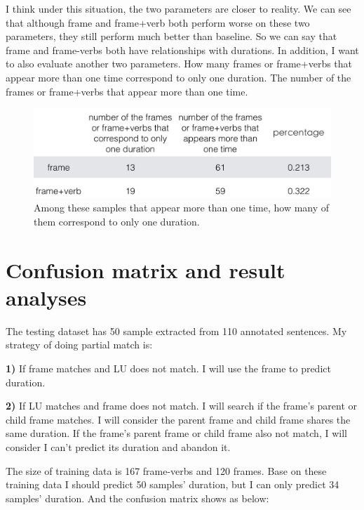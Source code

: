 \documentclass[11pt,a4paper]{article}
\begin{document}
I think under this situation, the two parameters are closer to reality. We can see that although frame and frame+verb both perform worse on these two parameters, they still perform much better than baseline. So we can say that frame and frame-verbs both have relationships with durations.
In addition, I want to also evaluate another two parameters.
How many frames or frame+verbs that appear more than one time correspond to only one duration.
The number of the frames or frame+verbs that appear more than one time. 


\begin{figure}[H] 
\begin{center} 
\centerline{\includegraphics[width=\columnwidth]{figs/fig7.png}}
\caption{Among these samples that appear more than one time, how many of them correspond to only one duration.}
\label{seventh_fig}
\end{center}
\vskip -0.3in
\end{figure}


\section{Confusion matrix and result analyses}

The testing dataset has 50 sample extracted from 110 annotated sentences. My strategy of doing partial match is:

\textbf{1)} If frame matches and LU does not match. I will use the frame to predict duration.

\textbf{2)} If LU matches and frame does not match. I will search if the frame's parent or child frame
matches. I will consider the parent frame and child frame shares the same duration. If the frame's parent frame or child frame also not match, I will consider I can't predict its duration and abandon it.

The size of training data is 167 frame-verbs and 120 frames. Base on these training data I should predict 50 samples' duration, but I can only predict 34 samples' duration. And the confusion matrix shows as below:
\end{document}
